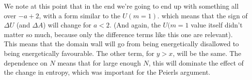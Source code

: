 \documentclass[../../PS3.tex]{subfiles}
\begin{document}
We note at this point that in the end we're going to end up with something all over $-a + 2$, with a form similar to the $U(m = 1)$. which means that the sign of $\Delta U$ (and $\Delta A$) will change for $a < 2$. (And again, the $U(m = 1$ value itself didn't matter so much, because only the difference terms like this one are relevant). This means that the domain wall will go from being energetically disallowed to being energetically favourable. The other term, for $y > x$, will be the same. The dependence on $N$ means that for large enough $N$, this will dominate the effect of the change in entropy, which was important for the Peierls argument. 
\end{document}
